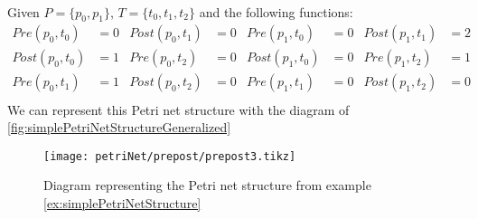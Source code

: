 \begin{example} ~\\
  \label{ex:simplePetriNetStructure}
  Given $P = \{p_0,p_1\}$, $T = \{t_0,t_1,t_2\}$ and the following functions:
  \begin{align*}
   Pre(p_0,t_0)& = 0  &  Post(p_0,t_1) &= 0 & Pre(p_1,t_0) &= 0 &  Post(p_1,t_1) &= 2 \\
   Post(p_0,t_0) &= 1  &    Pre(p_0,t_2) &= 0   & Post(p_1,t_0) &= 0   & Pre(p_1,t_2) &= 1\\
   Pre(p_0,t_1) &= 1    &  Post(p_0,t_2) &= 0  &  Pre(p_1,t_1) &= 0     &Post(p_1,t_2) &= 0\\
  \end{align*}
  We can represent this Petri net structure with the diagram of \autoref{fig:simplePetriNetStructureGeneralized}
\end{example}
\begin{figure}[H]
  \centering
  \texttt{[image: petriNet/prepost/prepost3.tikz]}
  \caption{Diagram representing the Petri net structure from example \ref{ex:simplePetriNetStructure}}
\label{fig:simplePetriNetStructureGeneralized}
\end{figure}

